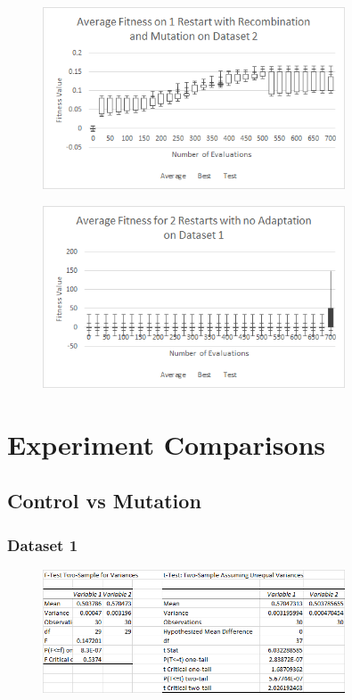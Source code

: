 \documentclass{article}
\begin{document}
\begin{figure}[h]
	\centering
	\includegraphics[width=0.8\textwidth]{res1adaptReMuDS2}
\end{figure}
\newpage
\begin{figure}[h]
	\centering
	\includegraphics[width=0.8\textwidth]{res2adaptNoDS1}
\end{figure}
\newpage

\section{Experiment Comparisons}

\subsection{Control vs Mutation}
\subsubsection{Dataset 1}
\begin{figure}[h]
	\centering
	\includegraphics[width=0.8\textwidth]{DS1ControlvsMu}
\end{figure}
\end{document}
